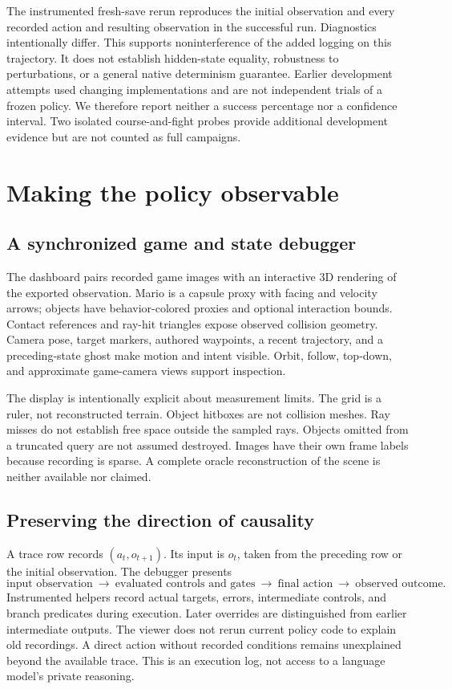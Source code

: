 \documentclass[10pt,letterpaper]{article}
\begin{document}
The instrumented fresh-save rerun reproduces the initial observation and every recorded action and resulting observation in the successful run. Diagnostics intentionally differ. This supports noninterference of the added logging on this trajectory. It does not establish hidden-state equality, robustness to perturbations, or a general native determinism guarantee. Earlier development attempts used changing implementations and are not independent trials of a frozen policy. We therefore report neither a success percentage nor a confidence interval. Two isolated course-and-fight probes provide additional development evidence but are not counted as full campaigns.

\clearpage
\section{Making the policy observable}
\subsection{A synchronized game and state debugger}
The dashboard pairs recorded game images with an interactive 3D rendering of the exported observation. Mario is a capsule proxy with facing and velocity arrows; objects have behavior-colored proxies and optional interaction bounds. Contact references and ray-hit triangles expose observed collision geometry. Camera pose, target markers, authored waypoints, a recent trajectory, and a preceding-state ghost make motion and intent visible. Orbit, follow, top-down, and approximate game-camera views support inspection.

The display is intentionally explicit about measurement limits. The grid is a ruler, not reconstructed terrain. Object hitboxes are not collision meshes. Ray misses do not establish free space outside the sampled rays. Objects omitted from a truncated query are not assumed destroyed. Images have their own frame labels because recording is sparse. A complete oracle reconstruction of the scene is neither available nor claimed.

\subsection{Preserving the direction of causality}
A trace row records $(a_t,o_{t+1})$. Its input is $o_t$, taken from the preceding row or the initial observation. The debugger presents
\[
 \boxed{\text{input observation}}\ \longrightarrow\
 \boxed{\text{evaluated controls and gates}}\ \longrightarrow\
 \boxed{\text{final action}}\ \longrightarrow\
 \boxed{\text{observed outcome}}.
\]
Instrumented helpers record actual targets, errors, intermediate controls, and branch predicates during execution. Later overrides are distinguished from earlier intermediate outputs. The viewer does not rerun current policy code to explain old recordings. A direct action without recorded conditions remains unexplained beyond the available trace. This is an execution log, not access to a language model's private reasoning.
\end{document}
